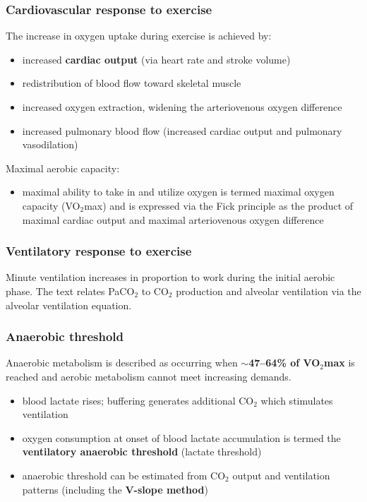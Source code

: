 \documentclass[11pt,a4paper]{article}
\begin{document}
\subsubsection{Cardiovascular response to exercise}
The increase in oxygen uptake during exercise is achieved by:
\begin{itemize}
\item increased \textbf{cardiac output} (via heart rate and stroke volume)
\item redistribution of blood flow toward skeletal muscle
\item increased oxygen extraction, widening the arteriovenous oxygen difference
\item increased pulmonary blood flow (increased cardiac output and pulmonary vasodilation)
\end{itemize}
Maximal aerobic capacity:
\begin{itemize}
\item maximal ability to take in and utilize oxygen is termed maximal oxygen capacity (VO$_2$max) and is expressed via the Fick principle as the product of maximal cardiac output and maximal arteriovenous oxygen difference
\end{itemize}

\subsubsection{Ventilatory response to exercise}
Minute ventilation increases in proportion to work during the initial aerobic phase. The text relates PaCO$_2$ to CO$_2$ production and alveolar ventilation via the alveolar ventilation equation.

\subsubsection{Anaerobic threshold}
Anaerobic metabolism is described as occurring when \textbf{$\sim$47--64\% of VO$_2$max} is reached and aerobic metabolism cannot meet increasing demands.
\begin{itemize}
\item blood lactate rises; buffering generates additional CO$_2$ which stimulates ventilation
\item oxygen consumption at onset of blood lactate accumulation is termed the \textbf{ventilatory anaerobic threshold} (lactate threshold)
\item anaerobic threshold can be estimated from CO$_2$ output and ventilation patterns (including the \textbf{V-slope method})
\end{itemize}
\end{document}
